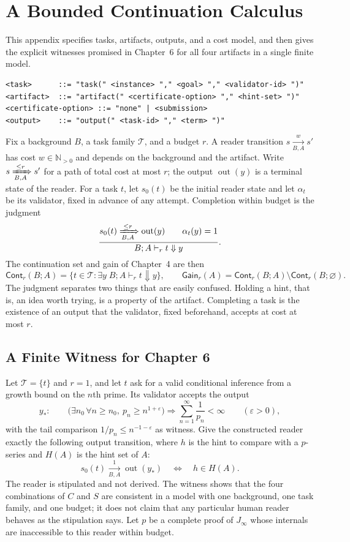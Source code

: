 \documentclass[11pt]{book}
\theoremstyle{definition}
\theoremstyle{remark}
\newcommand{\Cont}{\mathsf{Cont}}
\newcommand{\Gain}{\mathsf{Gain}}
\begin{document}
\chapter{A Bounded Continuation Calculus}\label{app:B}

This appendix specifies tasks, artifacts, outputs, and a cost model, and then gives the explicit witnesses promised in Chapter~6 for all four artifacts in a single finite model.

\begin{verbatim}
<task>      ::= "task(" <instance> "," <goal> "," <validator-id> ")"
<artifact>  ::= "artifact(" <certificate-option> "," <hint-set> ")"
<certificate-option> ::= "none" | <submission>
<output>    ::= "output(" <task-id> "," <term> ")"
\end{verbatim}

Fix a background $B$, a task family $\mathcal T$, and a budget $r$. A reader transition $s\xrightarrow[B,A]{w}s'$ has cost $w\in\mathbb N_{>0}$ and depends on the background and the artifact. Write $s\xRightarrow[B,A]{\le r}s'$ for a path of total cost at most $r$; the output $\operatorname{out}(y)$ is a terminal state of the reader. For a task $t$, let $s_0(t)$ be the initial reader state and let $\alpha_t$ be its validator, fixed in advance of any attempt. Completion within budget is the judgment
\[
\frac{s_0(t)\xRightarrow[B,A]{\le r}\operatorname{out}(y)\qquad\alpha_t(y)=1}
     {B;A\vdash_r t\Downarrow y}.
\]
The continuation set and gain of Chapter~4 are then
\[
\Cont_r(B;A)=\{t\in\mathcal T:\exists y\;B;A\vdash_r t\Downarrow y\},\qquad
\Gain_r(A)=\Cont_r(B;A)\setminus\Cont_r(B;\varnothing).
\]
The judgment separates two things that are easily confused. Holding a hint, that is, an idea worth trying, is a property of the artifact. Completing a task is the existence of an output that the validator, fixed beforehand, accepts at cost at most $r$.

\section*{A Finite Witness for Chapter 6}

Let $\mathcal T=\{t\}$ and $r=1$, and let $t$ ask for a valid conditional inference from a growth bound on the $n$th prime. Its validator accepts the output
\[
y_\ast:\qquad
\bigl(\exists n_0\,\forall n\ge n_0,\ p_n\ge n^{1+\varepsilon}\bigr)
\Longrightarrow
\sum_{n=1}^{\infty}\frac1{p_n}<\infty\qquad(\varepsilon>0),
\]
with the tail comparison $1/p_n\le n^{-1-\varepsilon}$ as witness. Give the constructed reader exactly the following output transition, where $h$ is the hint to compare with a $p$-series and $H(A)$ is the hint set of $A$:
\[
s_0(t)\xrightarrow[B,A]{1}\operatorname{out}(y_\ast)
\quad\Longleftrightarrow\quad h\in H(A).
\]
The reader is stipulated and not derived. The witness shows that the four combinations of $C$ and $S$ are consistent in a model with one background, one task family, and one budget; it does not claim that any particular human reader behaves as the stipulation says. Let $p$ be a complete proof of $J_\infty$ whose internals are inaccessible to this reader within budget.
\end{document}
